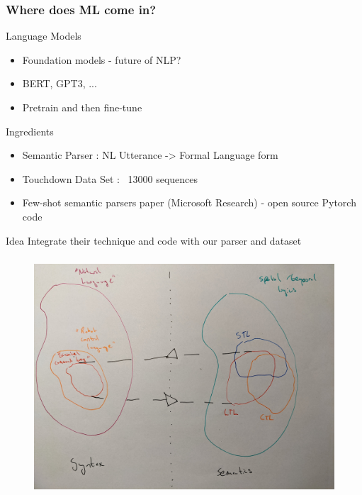 \documentclass{beamer}
\begin{document}
\begin{frame}
\frametitle{Where does ML come in?}

\begin{exampleblock}{Language Models}
\begin{itemize}
\item Foundation models - future of NLP?
\item BERT, GPT3, ...
\item Pretrain and then fine-tune
\end{itemize}
\end{exampleblock}

\begin{block}{Ingredients}
\begin{itemize}
\item Semantic Parser : NL Utterance -> Formal Language form
\item Touchdown Data Set : ~13000 sequences
\item Few-shot semantic parsers paper (Microsoft Research) - open source Pytorch code
\end{itemize}
\end{block}

\begin{alertblock}{Idea}
Integrate their technique and code with our parser and dataset
\end{alertblock}

\end{frame}


\begin{frame}
\frametitle{}
\begin{figure}
\hspace*{-3mm}%
   \includegraphics[width= \paperwidth]{pics/one.jpg}
\end{figure}
\end{frame}
\end{document}
